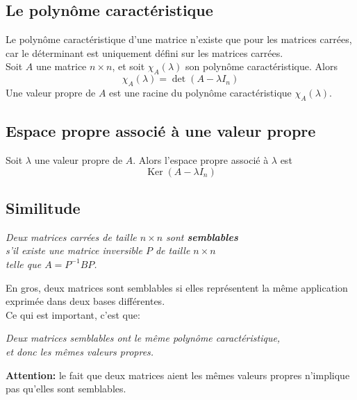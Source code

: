 \documentclass{article}
\numberwithin{equation}{section}
\newcommand\defn{\vspace{4px}\noindent \quad {\large \underline{\textsc{Définition }}: }}
\DeclareMathOperator{\ke}{Ker}
\begin{document}
\subsection{Le polynôme caractéristique}
Le polynôme caractéristique d'une matrice n'existe que pour les matrices carrées, car le déterminant est uniquement défini sur les matrices carrées. \\
Soit \(A\) une matrice \(n \times n\), et soit \(\chi_A(\lambda)\) son polynôme caractéristique. Alors
\begin{equation}
	\chi_A(\lambda) = \det(A-\lambda I_n)
\end{equation}
Une valeur propre de \(A\) est une racine du polynôme caractéristique \(\chi_A(\lambda)\). 

\subsection{Espace propre associé à une valeur propre}
Soit \(\lambda\) une valeur propre de \(A\). Alors l'espace propre associé à \(\lambda\) est
\begin{equation}
	\ke(A-\lambda I_n)
\end{equation}

\subsection{Similitude}
\defn
\begin{center}
	\emph{Deux matrices carrées de taille \(n \times n\) sont \textbf{semblables} \\ s'il existe une matrice inversible \(P\) de taille \(n \times n\) \\ telle que \(A = P^{-1}BP\).}
\end{center}

En gros, deux matrices sont semblables si elles représentent la même application exprimée dans deux bases différentes. \\
Ce qui est important, c'est que:
\begin{center}
	\emph{Deux matrices semblables ont le même polynôme caractéristique, \\ et donc les mêmes valeurs propres.}
\end{center}
\textbf{Attention:} le fait que deux matrices aient les mêmes valeurs propres n'implique pas qu'elles sont semblables.
\end{document}
